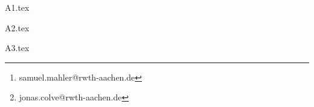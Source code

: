 \documentclass[12pt,a4paper]{scrartcl}
\author{Samuel Mahler, Mat.-Nr: 987654\thanks{samuel.mahler@rwth-aachen.de}\ ,
		\and Le Catal, Mat.Nr: 123456\thanks{jonas.colve@rwth-aachen.de}}
\begin{document}
\parindent0cm

\maketitle

\newpage

\psection

{A1.tex}

\psection

{A2.tex}

\psection

{A3.tex}




\end{document}

